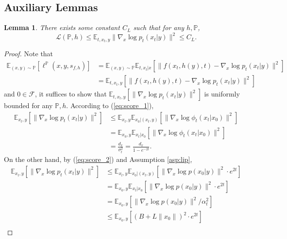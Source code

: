 \documentclass{article}
\numberwithin{equation}{section}
\def\eqref#1{equation~\ref{#1}}
\newcommand{\E}{\mathbb{E}}
\newtheorem{lemma}[thm]{Lemma}
\theoremstyle{definition}
\renewcommand{\P}{\mathbb{P}}
\renewcommand{\eqref}[1]{(\ref{#1})}
\begin{document}
\subsection{Auxiliary Lemmas}

\begin{lemma}\label{lem:bound L(P,h)}
    There exists some constant $C_L$ such that for any $h,\P$, 
    \begin{equation}
        \mathcal{L}(\P,h)\leq\E_{t,x_t,y}\|\nabla_x\log p_t(x_t|y)\|^2\leq C_L.
    \end{equation} 
\end{lemma}

\begin{proof}
    Note that
    \begin{equation}
        \begin{aligned}
            \E_{(x,y)\sim\P}[\ell^\P(x,y,s_{f,h})]
            &=\E_{(x,y)\sim\P}\E_{t,x_t|x}[\|f(x_t,h(y),t)-\nabla_x\log p_t(x_t|y)\|^2] \\
            &= \E_{t,x_t,y}[\|f(x_t,h(y),t)-\nabla_x\log p_t(x_t|y)\|^2]
        \end{aligned}
    \end{equation}
    and $0\in\mathcal{F}$, it suffices to show that $\E_{t,x_t,y}[\|\nabla_x\log p_t(x_t|y)\|^2]$ is uniformly bounded for any $\P,h$.
    According to \eqref{eq:score_1}, 
    \begin{equation}
        \begin{aligned}
        \E_{x_t,y}[\|\nabla_x\log p_t(x_t|y)\|^2]
        &\leq \E_{x_t,y}\E_{x_0|(x_t,y)}[\|\nabla_x\log \phi_t(x_t|x_0)\|^2] \\
        &= \E_{x_0,y}\E_{x_t|x_0}[\|\nabla_x\log \phi_t(x_t|x_0)\|^2] \\
        &=\frac{d_x}{\sigma_t^2}=\frac{d_x}{1-e^{-2t}}.
        \end{aligned}
    \end{equation}
    On the other hand, by \eqref{eq:score_2} and Assumption \ref{asp:lip},
    \begin{equation}
        \begin{aligned}
        \E_{x_t,y}[\|\nabla_x\log p_t(x_t|y)\|^2]
        &\leq \E_{x_t,y}\E_{x_0|(x_t,y)}[\|\nabla_x\log p(x_0|y)\|^2\cdot e^{2t}] \\
        &= \E_{x_0,y}\E_{x_t|x_0}[\|\nabla_x\log p(x_0|y)\|^2\cdot e^{2t}] \\
        &=\E_{x_0,y}[\|\nabla_x\log p(x_0|y)\|^2/\alpha_t^2] \\
        &\leq\E_{x_0,y}[(B+L\|x_0\|)^2\cdot e^{2t}] \\

\end{aligned}
\end{equation}
\end{proof}
\end{document}
